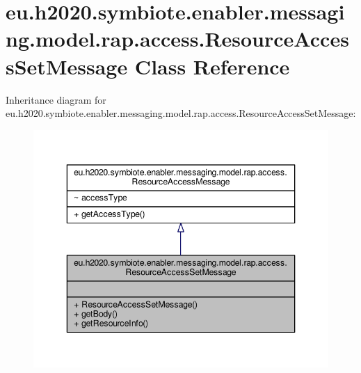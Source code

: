 \hypertarget{classeu_1_1h2020_1_1symbiote_1_1enabler_1_1messaging_1_1model_1_1rap_1_1access_1_1ResourceAccessSetMessage}{}\section{eu.\+h2020.\+symbiote.\+enabler.\+messaging.\+model.\+rap.\+access.\+Resource\+Access\+Set\+Message Class Reference}
\label{classeu_1_1h2020_1_1symbiote_1_1enabler_1_1messaging_1_1model_1_1rap_1_1access_1_1ResourceAccessSetMessage}


Inheritance diagram for eu.\+h2020.\+symbiote.\+enabler.\+messaging.\+model.\+rap.\+access.\+Resource\+Access\+Set\+Message\+:
\nopagebreak
\begin{figure}[H]
\begin{center}
\leavevmode
\includegraphics[width=346pt]{classeu_1_1h2020_1_1symbiote_1_1enabler_1_1messaging_1_1model_1_1rap_1_1access_1_1ResourceAccessSetMessage__inherit__graph}
\end{center}
\end{figure}


